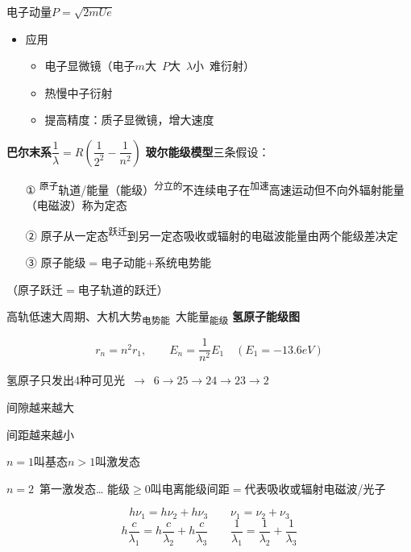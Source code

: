 电子动量\quad $P=\sqrt{2mUe}$ %

\begin{itemize}
\item 应用
  \begin{itemize}
  \item 电子显微镜（电子$m$大\ $P$大\ $\lambda$小\ 难衍射） %
  \item 热慢中子衍射 %
  \item 提高精度：质子显微镜，增大速度
  \end{itemize}
\end{itemize}
\textbf{巴尔末系}\quad $\dfrac{1}{\lambda}=R\left(\dfrac{1}{2^2}-\dfrac{1}{n^2}\right)$
\textbf{玻尔能级模型}\quad 三条假设：
\begin{itemize}
\item[①] \textsuperscript{原子}轨道/能量（能级）\textsuperscript{分立的}不连续\quad 电子在\textsuperscript{加速}高速运动但不向外辐射能量（电磁波）\quad 称为定态 %
\item[②] 原子从一定态\textsuperscript{跃迁}到另一定态\quad 吸收或辐射的电磁波能量\quad 由两个能级差决定
\item[③] 原子能级$=$电子动能$+$系统电势能
\end{itemize}

（原子跃迁$=$电子轨道的跃迁） %

高轨低速大周期、大机大势\textsubscript{电势能}\ 大能量\textsubscript{能级}
\textbf{氢原子能级图}

\[
r_n=n^2r_1,\qquad E_n=\frac{1}{n^2}E_1\quad(E_1=-13.6\unit{eV})
\]


氢原子只发出4种可见光\ $\to$\ $6\to2$\quad $5\to2$\quad $4\to2$\quad $3\to2$ %


间隙越来越大 %


间距越来越小 %

$n=1$叫基态\quad $n>1$叫激发态

$n=2$\ 第一激发态…
能级$\ge0$叫电离\qquad 能级间距$=$代表吸收或辐射电磁波/光子

\[
h\nu_1=h\nu_2+h\nu_3\qquad \nu_1=\nu_2+\nu_3 %
\]
\[
h\frac{c}{\lambda_1}=h\frac{c}{\lambda_2}+h\frac{c}{\lambda_3}\qquad \frac{1}{\lambda_1}=\frac{1}{\lambda_2}+\frac{1}{\lambda_3}
\]
